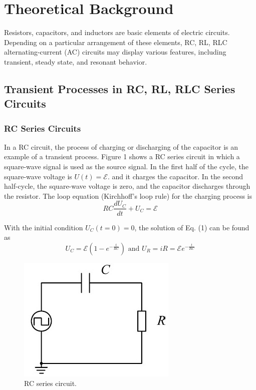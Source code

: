 \documentclass{article}
\begin{document}
\section{Theoretical Background}

Resistors, capacitors, and inductors are basic elements of electric circuits. Depending
on a particular arrangement of these elements, RC, RL, RLC alternating-current (AC)
circuits may display various features, including transient, steady state, and resonant behavior.

\subsection{Transient Processes in RC, RL, RLC Series Circuits}

\subsubsection{RC Series Circuits}

In a RC circuit, the process of charging or discharging of the capacitor is an example of a transient process. Figure 1 shows a RC series circuit in which a square-wave signal is used as the source signal. In the first half of the cycle, the square-wave voltage is $ U(t) = \mathcal{E} $. and it charges the capacitor. In the second half-cycle, the square-wave voltage is zero, and the capacitor discharges through the resistor. The loop equation (Kirchhoff's loop rule) for the charging process is
\begin{equation}
	RC\dfrac{dU_C}{dt}+U_C=\mathcal{E}
\end{equation}

With the initial condition $ U_C(t = 0) = 0 $, the solution of Eq. (1) can be found as
$$ U_C=\mathcal{E}(1-e^{-\frac{t}{RC}})\text{ and } U_R=iR=\mathcal{E}e^{-\frac{t}{RC}} $$

\begin{figure}[H]
	\centering
	\includegraphics[scale=0.6]{fig1.jpg}
	\caption{RC series circuit.}
\end{figure}
\end{document}
